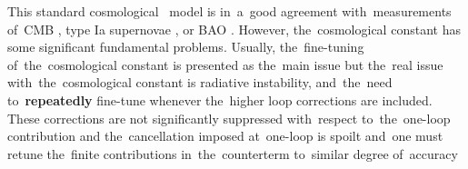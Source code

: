 
\label{ssec:lambda}
This standard cosmological \LCDM\ model is in~a~good agreement with~measurements of~CMB \parencite{planck_cosm}, type Ia supernovae \parencite{Abbott_2019}, or BAO \parencite{BAO_results}. However, the~cosmological constant has some significant fundamental problems. Usually, the~fine-tuning of~the~cosmological constant is presented as the~main issue but the~real issue with~the~cosmological constant is radiative instability, and~the~need to~\textbf{repeatedly} fine-tune whenever the~higher loop corrections are included. These corrections are not significantly suppressed with~respect to~the~one-loop contribution \parencite{2015arXiv150205296P,2012CRPhy..13..566M} and the~cancellation imposed at~one-loop is spoilt and~one must retune the~finite contributions in~the~counterterm to~similar degree of~accuracy

